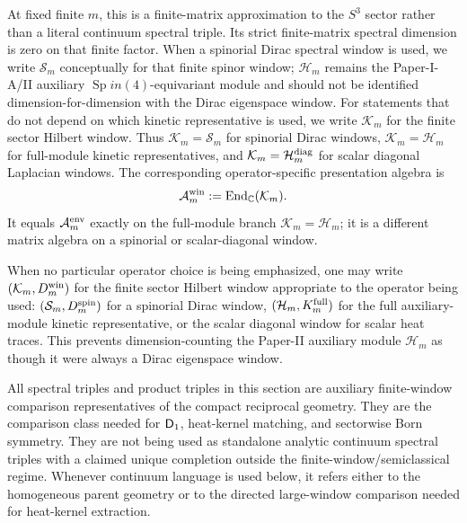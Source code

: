 \documentclass[12pt,a4paper]{article}
\begin{document}
\begin{definition}
At fixed finite \(m\), this is a finite-matrix approximation to the \(S^3\) sector rather than a literal continuum spectral triple.  Its strict finite-matrix spectral dimension is zero on that finite factor.  When a spinorial Dirac spectral window is used, we write \(\mathcal S_m\) conceptually for that finite spinor window; \(\mathcal H_m\) remains the Paper-I-A/II auxiliary \(\operatorname{Sp}in(4)\)-equivariant module and should not be identified dimension-for-dimension with the Dirac eigenspace window.
For statements that do not depend on which kinetic representative is used, we write \(\mathcal K_m\) for the finite sector Hilbert window.  Thus \(\mathcal K_m=\mathcal S_m\) for spinorial Dirac windows, \(\mathcal K_m=\mathcal H_m\) for full-module kinetic representatives, and \(\mathcal K_m=\mathcal H_m^{\rm diag}\) for scalar diagonal Laplacian windows.
The corresponding operator-specific presentation algebra is
\[
 \mathcal A_m^{\rm win}:=\operatorname{End}_{\mathbb{C}}(\mathcal K_m).
\]
It equals \(\mathcal A_m^{\rm env}\) exactly on the full-module branch
\(\mathcal K_m=\mathcal H_m\); it is a different matrix algebra on a
spinorial or scalar-diagonal window.

\end{definition}
\begin{remark}
When no particular operator choice is being emphasized, one may write \((\mathcal K_m,D_m^{\rm win})\) for the finite sector Hilbert window appropriate to the operator being used: \((\mathcal S_m,D_m^{\rm spin})\) for a spinorial Dirac window, \((\mathcal H_m,K_m^{\rm full})\) for the full auxiliary-module kinetic representative, or the scalar diagonal window for scalar heat traces.  This prevents dimension-counting the Paper-II auxiliary module \(\mathcal H_m\) as though it were always a Dirac eigenspace window.
\end{remark}


\begin{remark}
All spectral triples and product triples in this section are auxiliary finite-window comparison representatives of the compact reciprocal geometry.  They are the comparison class needed for \(\mathsf{D}_1\), heat-kernel matching, and sectorwise Born symmetry.  They are not being used as standalone analytic continuum spectral triples with a claimed unique completion outside the finite-window/semiclassical regime.  Whenever continuum language is used below, it refers either to the homogeneous parent geometry or to the directed large-window comparison needed for heat-kernel extraction.
\end{remark}
\end{document}
